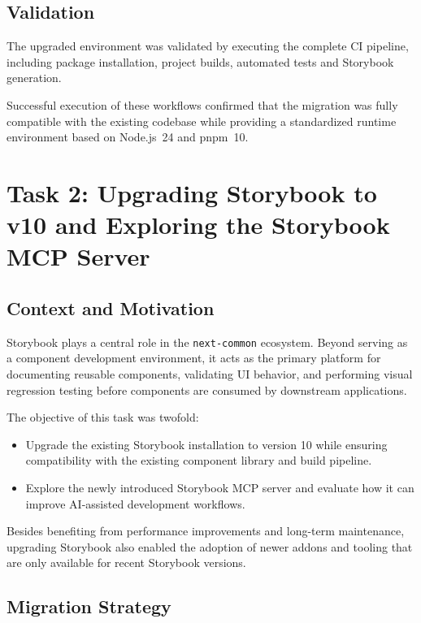 \subsection{Validation}

The upgraded environment was validated by executing the complete \ac{CI} pipeline, including package installation, project builds, automated tests and Storybook generation.

Successful execution of these workflows confirmed that the migration was fully compatible with the existing codebase while providing a standardized runtime environment based on Node.js~24 and pnpm~10.

\section{Task 2: Upgrading Storybook to v10 and Exploring the Storybook MCP Server}
\label{sec:storybook-upgrade}

\subsection{Context and Motivation}

Storybook plays a central role in the \texttt{next-common} ecosystem. Beyond serving as a component development environment, it acts as the primary platform for documenting reusable components, validating UI behavior, and performing visual regression testing before components are consumed by downstream applications.

The objective of this task was twofold:

\begin{itemize}
    \item Upgrade the existing Storybook installation to version 10 while ensuring compatibility with the existing component library and build pipeline.
    \item Explore the newly introduced Storybook \ac{MCP} server and evaluate how it can improve AI-assisted development workflows.
\end{itemize}

Besides benefiting from performance improvements and long-term maintenance, upgrading Storybook also enabled the adoption of newer addons and tooling that are only available for recent Storybook versions.

\subsection{Migration Strategy}

